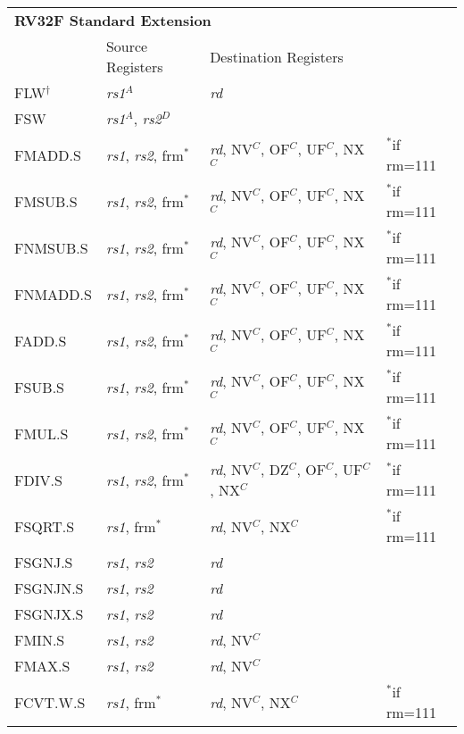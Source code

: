 \begin{tabular}{p{25mm}|p{3cm}|p{6cm}|p{10cm}}
  \multicolumn{4}{l}{\bf RV32F Standard Extension} \\
  \cline{2-3}
   & Source Registers & Destination Registers \\
  \cline{2-3}
   FLW$^\dagger$ & {\em rs1}$^A$ & {\em rd} &  \\
   \cline{2-3}
   FSW & {\em rs1}$^A$, {\em rs2}$^D$ &  &  \\
   \cline{2-3}
   FMADD.S & {\em rs1}, {\em rs2}, frm$^*$ & {\em rd}, NV$^C$, OF$^C$, UF$^C$, NX$^C$ & $^*$if rm=111 \\
   \cline{2-3}
   FMSUB.S & {\em rs1}, {\em rs2}, frm$^*$ & {\em rd}, NV$^C$, OF$^C$, UF$^C$, NX$^C$ & $^*$if rm=111 \\
   \cline{2-3}
   FNMSUB.S & {\em rs1}, {\em rs2}, frm$^*$ & {\em rd}, NV$^C$, OF$^C$, UF$^C$, NX$^C$ & $^*$if rm=111 \\
   \cline{2-3}
   FNMADD.S & {\em rs1}, {\em rs2}, frm$^*$ & {\em rd}, NV$^C$, OF$^C$, UF$^C$, NX$^C$ & $^*$if rm=111 \\
   \cline{2-3}
   FADD.S & {\em rs1}, {\em rs2}, frm$^*$ & {\em rd}, NV$^C$, OF$^C$, UF$^C$, NX$^C$ & $^*$if rm=111 \\
   \cline{2-3}
   FSUB.S & {\em rs1}, {\em rs2}, frm$^*$ & {\em rd}, NV$^C$, OF$^C$, UF$^C$, NX$^C$ & $^*$if rm=111 \\
   \cline{2-3}
   FMUL.S & {\em rs1}, {\em rs2}, frm$^*$ & {\em rd}, NV$^C$, OF$^C$, UF$^C$, NX$^C$ & $^*$if rm=111 \\
   \cline{2-3}
   FDIV.S & {\em rs1}, {\em rs2}, frm$^*$ & {\em rd}, NV$^C$, DZ$^C$, OF$^C$, UF$^C$, NX$^C$ & $^*$if rm=111 \\
   \cline{2-3}
   FSQRT.S & {\em rs1}, frm$^*$ & {\em rd}, NV$^C$, NX$^C$ & $^*$if rm=111 \\
   \cline{2-3}
   FSGNJ.S & {\em rs1}, {\em rs2} & {\em rd} &  \\
   \cline{2-3}
   FSGNJN.S & {\em rs1}, {\em rs2} & {\em rd} &  \\
   \cline{2-3}
   FSGNJX.S & {\em rs1}, {\em rs2} & {\em rd} &  \\
   \cline{2-3}
   FMIN.S & {\em rs1}, {\em rs2} & {\em rd}, NV$^C$ &  \\
   \cline{2-3}
   FMAX.S & {\em rs1}, {\em rs2} & {\em rd}, NV$^C$ &  \\
   \cline{2-3}
   FCVT.W.S & {\em rs1}, frm$^*$ & {\em rd}, NV$^C$, NX$^C$ & $^*$if rm=111 \\
   \cline{2-3}

\end{tabular}
